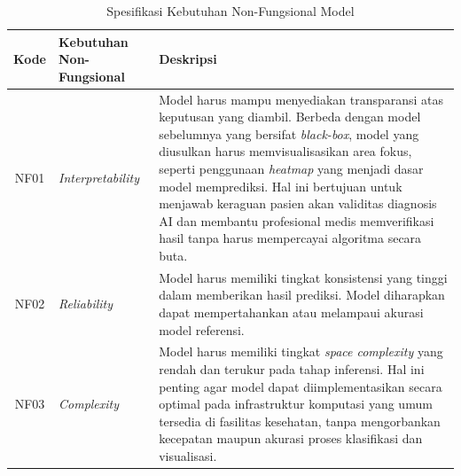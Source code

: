 \begin{table}[H]
	\centering
	\caption{Spesifikasi Kebutuhan Non-Fungsional Model}
	\label{tab:kebutuhan_non_fungsional}
	\begin{tabular}{|c|l|p{9.5cm}|}
		\hline
		\textbf{Kode} & \textbf{Kebutuhan Non-Fungsional} & \textbf{Deskripsi} \\ \hline
		NF01 & \textit{Interpretability} & Model harus mampu menyediakan transparansi atas keputusan yang diambil. Berbeda dengan model sebelumnya yang bersifat \textit{black-box}, model yang diusulkan harus memvisualisasikan area fokus, seperti penggunaan \textit{heatmap} yang menjadi dasar model memprediksi. Hal ini bertujuan untuk menjawab keraguan pasien akan validitas diagnosis AI dan membantu profesional medis memverifikasi hasil tanpa harus mempercayai algoritma secara buta. \\ \hline
		NF02 & \textit{Reliability} & Model harus memiliki tingkat konsistensi yang tinggi dalam memberikan hasil prediksi. Model diharapkan dapat mempertahankan atau melampaui akurasi model referensi. \\ \hline
		NF03 & \textit{Complexity} & Model harus memiliki tingkat \textit{space complexity} yang rendah dan terukur pada tahap inferensi. Hal ini penting agar model dapat diimplementasikan secara optimal pada infrastruktur komputasi yang umum tersedia di fasilitas kesehatan, tanpa mengorbankan kecepatan maupun akurasi proses klasifikasi dan visualisasi. \\ \hline
	\end{tabular}
\end{table}